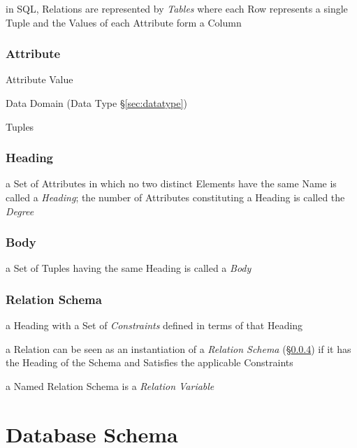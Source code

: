in SQL, Relations are represented by \emph{Tables} where each Row represents a
single Tuple and the Values of each Attribute form a Column



\subsubsection{Attribute}\label{sec:database_attribute}

Attribute Value

Data Domain (Data Type \S\ref{sec:datatype})

Tuples



\subsubsection{Heading}\label{sec:heading}

a Set of Attributes in which no two distinct Elements have the same Name is
called a \emph{Heading}; the number of Attributes constituting a Heading is
called the \emph{Degree}



\subsubsection{Body}\label{sec:body}

a Set of Tuples having the same Heading is called a \emph{Body}



\subsubsection{Relation Schema}\label{sec:relation_schema}

a Heading with a Set of \emph{Constraints} defined in terms of that Heading

a Relation can be seen as an instantiation of a \emph{Relation Schema}
(\S\ref{sec:relation_schema}) if it has the Heading of the Schema and Satisfies
the applicable Constraints

a Named Relation Schema is a \emph{Relation Variable}



\section{Database Schema}\label{sec:database_schema}

